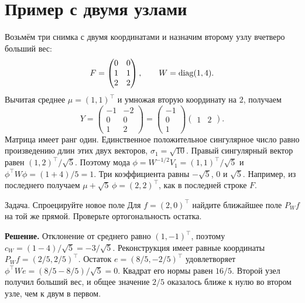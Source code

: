 \section{Пример с двумя узлами}
Возьмём три снимка с двумя координатами и назначим второму узлу
вчетверо больший вес:
\begin{equation}
 F=\begin{pmatrix}0&0\\1&1\\2&2\end{pmatrix},\qquad W=\operatorname{diag}(1,4).
 \label{math:example-data}
\end{equation}
Вычитая среднее $\mu=(1,1)^\top$ и умножая вторую координату на $2$,
получаем
\[
 Y=\begin{pmatrix}-1&-2\\0&0\\1&2\end{pmatrix}
 =\begin{pmatrix}-1\\0\\1\end{pmatrix}\begin{pmatrix}1&2\end{pmatrix}.
\]
Матрица имеет ранг один. Единственное положительное сингулярное число
равно произведению длин этих двух векторов, $\sigma_1=\sqrt{10}$.
Правый сингулярный вектор равен $(1,2)^\top/\sqrt5$. Поэтому мода
$\phi=W^{-1/2}V_1=(1,1)^\top/\sqrt5$ и
$\phi^\top W\phi=(1+4)/5=1$. Три коэффициента равны $-\sqrt5$, $0$ и
$\sqrt5$. Например, из последнего получаем
$\mu+\sqrt5\,\phi=(2,2)^\top$, как в последней строке $F$.

\begin{worked}{Задача. Спроецируйте новое поле}
Для $f=(2,0)^\top$ найдите ближайшее поле $P_W f$ на той же прямой.
Проверьте ортогональность остатка.

\textbf{Решение.} Отклонение от среднего равно $(1,-1)^\top$, поэтому
$c_W=(1-4)/\sqrt5=-3/\sqrt5$. Реконструкция имеет равные координаты
$P_W f=(2/5,2/5)^\top$. Остаток $e=(8/5,-2/5)^\top$ удовлетворяет
$\phi^\top We=(8/5-8/5)/\sqrt5=0$. Квадрат его нормы равен $16/5$.
Второй узел получил больший вес, и общее значение $2/5$ оказалось
ближе к нулю во втором узле, чем к двум в первом.
\end{worked}

